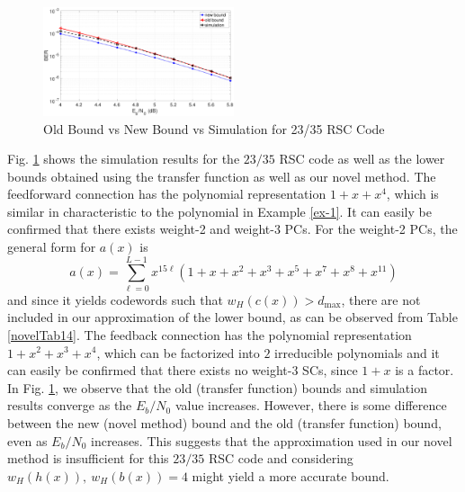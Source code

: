 \begin{figure}[htbp]
\centering
		\includegraphics[width=0.5\textwidth]{./Images/RSC_23_35_lower_weights.eps}
		\caption{Old Bound vs New Bound vs Simulation for 23/35 RSC Code}
		\label{simFig3}
		\end{figure}
Fig. \ref{simFig3} shows the simulation results for the $23/35$ RSC code as well as the lower bounds obtained using the transfer function as well as our novel method. The feedforward connection has the polynomial representation $1+x+x^4$, which is similar in characteristic to the polynomial in Example \ref{ex-1}. It can easily be confirmed that there exists weight-2 and weight-3 PCs. For the weight-2 PCs, the general form for $a(x)$ is
\begin{equation*}
a(x)=\sum_{\ell=0}^{L-1} x^{15\ell}(1+x+x^{2}+x^3+x^5+x^7+x^8+x^{11})
\end{equation*}
and since it yields codewords such that $w_H(c(x))>d_{\text{max}}$, there are not included in our approximation of the lower bound, as can be observed from Table \ref{novelTab14}. The feedback connection has the polynomial representation $1+x^2+x^3+x^4$, which can be factorized into $2$ irreducible polynomials and it can easily be confirmed that there exists no weight-3 SCs, since $1+x$ is a factor. In Fig. \ref{simFig3}, we observe that the old (transfer function) bounds and simulation results converge as the $E_b/N_0$ value increases. However, there is some difference between the new (novel method) bound and the old (transfer function) bound, even as $E_b/N_0$ increases. This suggests that the approximation used in our novel method is insufficient for this $23/35$ RSC code and considering  $w_H(h(x)),~w_H(b(x))=4$ might yield a more accurate bound.


		
		


